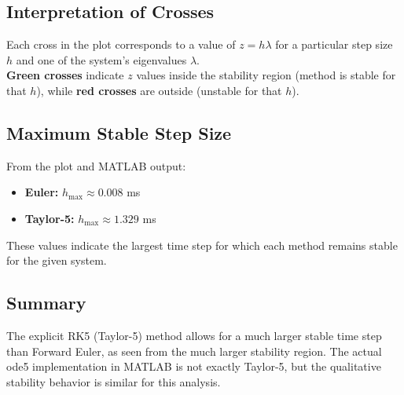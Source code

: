 \subsection*{Interpretation of Crosses}
Each cross in the plot corresponds to a value of $z = h \lambda$ for a particular step size $h$ and one of the system's eigenvalues $\lambda$. \\ 
	\textbf{Green crosses} indicate $z$ values inside the stability region (method is stable for that $h$), while \textbf{red crosses} are outside (unstable for that $h$).

\subsection*{Maximum Stable Step Size}
From the plot and MATLAB output:
\begin{itemize}
	\item \textbf{Euler:} $h_\text{max} \approx 0.008$ ms
	\item \textbf{Taylor-5:} $h_\text{max} \approx 1.329$ ms
\end{itemize}
These values indicate the largest time step for which each method remains stable for the given system.

\subsection*{Summary}
The explicit RK5 (Taylor-5) method allows for a much larger stable time step than Forward Euler, as seen from the much larger stability region. The actual ode5 implementation in MATLAB is not exactly Taylor-5, but the qualitative stability behavior is similar for this analysis.


